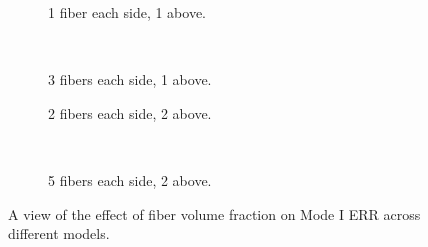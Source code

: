 \documentclass[review]{elsarticle}
\begin{document}
\begin{figure}[!h]
    \begin{subfigure}[b]{0.45\textwidth}
        \caption{1 fiber each side, 1 above.}\label{subfig:volfrac1eachside1aboveMI}
    \end{subfigure} ~
    \begin{subfigure}[b]{0.45\textwidth}
        \caption{3 fibers each side, 1 above.}\label{subfig:volfrac3eachside1aboveMI}
    \end{subfigure}

    \begin{subfigure}[b]{0.45\textwidth}
        \caption{2 fibers each side, 2 above.}\label{subfig:volfrac2eachside2aboveMI}
    \end{subfigure} ~
    \begin{subfigure}[b]{0.45\textwidth}
        \caption{5 fibers each side, 2 above.}\label{subfig:volfrac5eachside2aboveMI}
    \end{subfigure}

\caption{A view of the effect of fiber volume fraction on Mode I ERR across different models.}\label{fig:volumefractionMI}
\end{figure}
\end{document}

